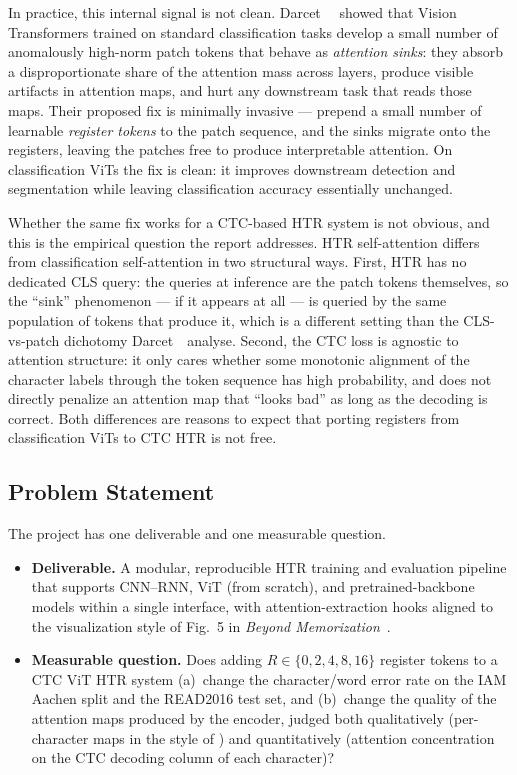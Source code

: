 In practice, this internal signal is not clean. Darcet~\etal~\cite{darcet2024registers} showed that Vision Transformers trained on standard classification tasks develop a small number of anomalously high-norm patch tokens that behave as \emph{attention sinks}: they absorb a disproportionate share of the attention mass across layers, produce visible artifacts in attention maps, and hurt any downstream task that reads those maps. Their proposed fix is minimally invasive --- prepend a small number of learnable \emph{register tokens} to the patch sequence, and the sinks migrate onto the registers, leaving the patches free to produce interpretable attention. On classification ViTs the fix is clean: it improves downstream detection and segmentation while leaving classification accuracy essentially unchanged.

Whether the same fix works for a CTC-based HTR system is not obvious, and this is the empirical question the report addresses. HTR self-attention differs from classification self-attention in two structural ways. First, HTR has no dedicated CLS query: the queries at inference are the patch tokens themselves, so the ``sink'' phenomenon --- if it appears at all --- is queried by the same population of tokens that produce it, which is a different setting than the CLS-vs-patch dichotomy Darcet~\etal\ analyse. Second, the CTC loss is agnostic to attention structure: it only cares whether some monotonic alignment of the character labels through the token sequence has high probability, and does not directly penalize an attention map that ``looks bad'' as long as the decoding is correct. Both differences are reasons to expect that porting registers from classification ViTs to CTC HTR is not free.

\subsection{Problem Statement}
\label{sec:problem_statement}

The project has one deliverable and one measurable question.

\begin{itemize}
    \item \textbf{Deliverable.} A modular, reproducible HTR training and evaluation pipeline that supports CNN--RNN, ViT (from scratch), and pretrained-backbone models within a single interface, with attention-extraction hooks aligned to the visualization style of Fig.~5 in \emph{Beyond Memorization}~\cite{nikolaidou2024beyondmem}.
    \item \textbf{Measurable question.} Does adding $R \in \{0, 2, 4, 8, 16\}$ register tokens to a CTC ViT HTR system (a)~change the character/word error rate on the IAM Aachen split and the READ2016 test set, and (b)~change the quality of the attention maps produced by the encoder, judged both qualitatively (per-character maps in the style of \cite{nikolaidou2024beyondmem}) and quantitatively (attention concentration on the CTC decoding column of each character)?
\end{itemize}

